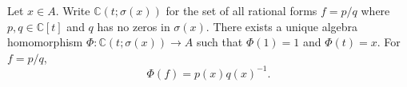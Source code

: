 Let $x \in A$. Write $\mathbb{C}(t; \sigma(x))$ for the set of all rational forms $f = p/q$ where $p, q \in \mathbb{C}[t]$ and $q$ has no zeros in $\sigma(x)$. There exists a unique algebra homomorphism $\Phi: \mathbb{C}(t; \sigma(x)) \to A$ such that $\Phi(1) = 1$ and $\Phi(t) = x$. For $f = p/q$,
$$\Phi(f) = p(x)q(x)^{-1}.$$
